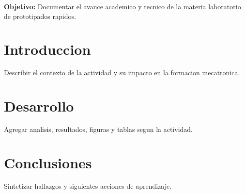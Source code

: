 \documentclass[spanish,letterpaper,oneside]{article}
\begin{document}
\templatePortrait
\templatePagecfg
\onehalfspacing

\begin{abstractd}
\textbf{Objetivo:} Documentar el avance academico y tecnico de la materia laboratorio de prototipados rapidos.
\end{abstractd}

\templateIndex
\templateFinalcfg

\section{Introduccion}
Describir el contexto de la actividad y su impacto en la formacion mecatronica.

\section{Desarrollo}
Agregar analisis, resultados, figuras y tablas segun la actividad.

\section{Conclusiones}
Sintetizar hallazgos y siguientes acciones de aprendizaje.



\end{document}
